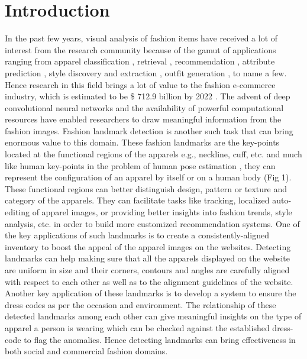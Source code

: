 \documentclass[conference]{IEEEtran}
\begin{document}
\section{Introduction}
In the past few years, visual analysis of fashion items have received a lot of interest from the research community because of the gamut of applications ranging from apparel classification \cite{huang2015cross, he2016identity, liu2016deepfashion}, retrieval \cite{liu2016fashion, fu2012efficient}, recommendation \cite{packer2018visually, agarwal2018personalizing}, attribute prediction \cite{liu2016deepfashion, wang2018attentive}, style discovery and extraction \cite{simo2016fashion, gabale2018extract}, outfit generation \cite{nakamura2018outfit}, to name a few. Hence research in this field brings a lot of value to the fashion e-commerce industry, which is estimated to be \$ 712.9 billion by 2022 \cite{FashionTrends}. The advent of deep convolutional neural networks and the availability of powerful computational resources have enabled researchers to draw meaningful information from the fashion images. 
Fashion landmark detection is another such task that can bring enormous value to this domain. These fashion landmarks are the key-points located at the functional regions of the apparels e.g., neckline, cuff, etc. and much like human key-points in the problem of human pose estimation \cite{andriluka14cvpr}, they can represent the configuration of an apparel by itself or on a human body (Fig 1). These functional regions can better distinguish design, pattern or texture and category of the apparels. They can facilitate tasks like  tracking, localized auto-editing of apparel images, or providing better insights into fashion trends, style analysis, etc. in order to build more customized recommendation systems. One of the key applications of such landmarks is to create a consistently-aligned inventory to boost the appeal of the apparel images on the websites. Detecting landmarks can help making sure that all the apparels displayed on the website are uniform in size and their corners, contours and angles are carefully aligned with respect to each other as well as to the alignment guidelines of the website. 
Another key application of these landmarks is to develop a  system to ensure the dress codes as per the occasion and environment. The relationship of these detected landmarks among each other can give meaningful insights on the type of apparel a person is wearing which can be checked against the established dress-code to flag the anomalies. Hence detecting landmarks can bring effectiveness in both social and commercial fashion domains.
\end{document}
